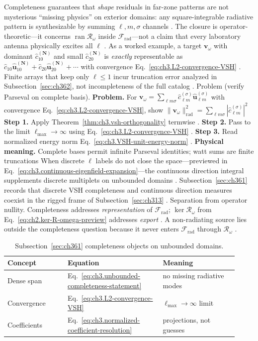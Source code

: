 Completeness guarantees that \emph{shape} residuals in far-zone patterns are not mysterious ``missing physics'' on
exterior domains: any square-integrable radiative pattern is synthesizable by summing \(\ell,m,\sigma\) channels
. The closure is operator-theoretic---it concerns
\(\operatorname{ran}\mathcal{R}_\omega\) inside \(\mathcal{F}_{\mathrm{rad}}\)---not a claim that every laboratory
antenna physically excites all \(\ell\) .
As a worked example, a target \(\mathbf{v}_\omega\) with dominant \(\widehat{c}_{10}^{(\mathbf{N})}\) and small
\(\widehat{c}_{20}^{(\mathbf{N})}\) is \emph{exactly} representable as \(\widehat{c}_{10}\widehat{\mathbf{u}}_{10}^{(\mathbf{N})}
+\widehat{c}_{20}\widehat{\mathbf{u}}_{20}^{(\mathbf{N})}+\cdots\) with convergence Eq.~\eqref{eq:ch3.L2-convergence-VSH}
. Finite arrays that keep only \(\ell\le1\) incur truncation error analyzed in
Subsection~\ref{sec:ch362}, not incompleteness of the full catalog .
Problem (verify Parseval on complete basis). \textbf{Problem.} For \(\mathbf{v}_\omega=\sum_{\ell m\sigma}\widehat{c}_{\ell m}^{(\sigma)}\widehat{\mathbf{u}}_{\ell m}^{(\sigma)}\)
with convergence Eq.~\eqref{eq:ch3.L2-convergence-VSH}, show
\(\|\mathbf{v}_\omega\|_{\mathrm{rad}}^{2}=\sum_{\ell m\sigma}|\widehat{c}_{\ell m}^{(\sigma)}|^{2}\)
\textbf{Step 1.} Apply Theorem~\ref{thm:ch3.vsh-orthogonality} termwise .
\textbf{Step 2.} Pass to the limit \(\ell_{\max}\to\infty\) using Eq.~\eqref{eq:ch3.L2-convergence-VSH} .
\textbf{Step 3.} Read normalized energy norm Eq.~\eqref{eq:ch3.VSH-unit-energy-norm} .
\textbf{Physical meaning.} Complete bases permit infinite Parseval identities; watt sums are finite truncations
When discrete \(\ell\) labels do not close the space---previewed in Eq.~\eqref{eq:ch3.continuous-eigenfield-expansion}---the
continuous direction integral supplements discrete multiplets on unbounded domains .
Subsection~\ref{sec:ch361} records that discrete VSH completeness and continuous direction measures coexist in the
rigged frame of Subsection~\ref{sec:ch313} .
Separation from operator nullity. Completeness addresses \emph{representation} of \(\mathcal{F}_{\mathrm{rad}}\); \(\ker\mathcal{R}_\omega\) from
Eq.~\eqref{eq:ch2.ker-R-omega-preview} addresses \emph{export} . A non-radiating
source lies outside the completeness question because it never enters \(\mathcal{F}_{\mathrm{rad}}\) through
\(\mathcal{R}_\omega\) .
\begin{table}[t]
\centering
\caption{Subsection~\ref{sec:ch361} completeness objects on unbounded domains.}
\label{tab:ch3.361-completeness-objects}
\small
\begin{tabular}{@{}p{0.24\linewidth}p{0.38\linewidth}p{0.30\linewidth}@{}}
\toprule
Concept & Equation & Meaning \\
\midrule
Dense span & Eq.~\eqref{eq:ch3.unbounded-completeness-statement} & no missing radiative modes \\
Convergence & Eq.~\eqref{eq:ch3.L2-convergence-VSH} & \(\ell_{\max}\to\infty\) limit \\
Coefficients & Eq.~\eqref{eq:ch3.normalized-coefficient-resolution} & projections, not guesses \\
\bottomrule
\end{tabular}
\end{table}
